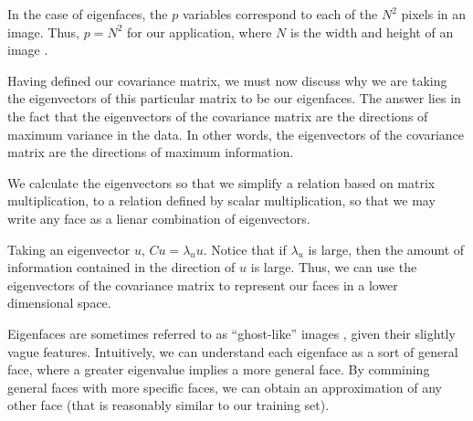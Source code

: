 \documentclass[12pt]{report}
\begin{document}

            In the case of eigenfaces, the $p$ variables correspond to each of the $N^2$ pixels in an image. Thus, $p = N^2$ for our application, where $N$ is the width and height of an image \cite{Janakiev2018}.

            Having defined our covariance matrix, we must now discuss why we are taking the eigenvectors of this particular matrix to be our eigenfaces. The answer lies in the fact that the eigenvectors of the covariance matrix are the directions of maximum variance in the data. In other words, the eigenvectors of the covariance matrix are the directions of maximum information. 

            We calculate the eigenvectors so that we simplify a relation based on matrix multiplication, to a relation defined by scalar multiplication, so that we may write any face as a lienar combination of eigenvectors.

            Taking an eigenvector $u$, $Cu=\lambda_u u$. Notice that if $\lambda_u$ is large, then the amount of information contained in the direction of $u$ is large. Thus, we can use the eigenvectors of the covariance matrix to represent our faces in a lower dimensional space.

            Eigenfaces are sometimes referred to as ``ghost-like'' images \cite{Dusenberry2015}, given their slightly vague features. Intuitively, we can understand each eigenface as a sort of general face, where a greater eigenvalue implies a more general face. By commining general faces with more specific faces, we can obtain an approximation of any other face (that is reasonably similar to our training set).
\end{document}
